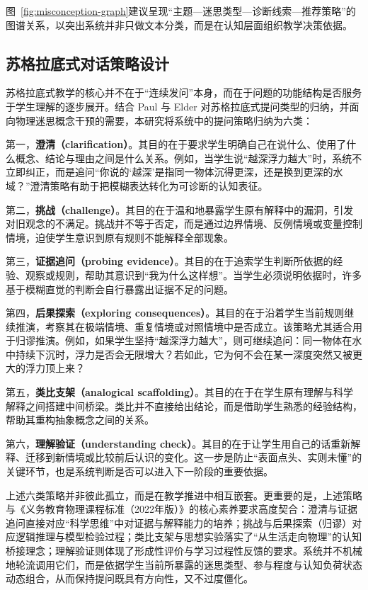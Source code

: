图~\ref{fig:misconception-graph}建议呈现“主题—迷思类型—诊断线索—推荐策略”的图谱关系，以突出系统并非只做文本分类，而是在认知层面组织教学决策依据。

\subsection{苏格拉底式对话策略设计}
\label{sec:4.2.2}

苏格拉底式教学的核心并不在于“连续发问”本身，而在于问题的功能结构是否服务于学生理解的逐步展开。结合 Paul 与 Elder 对苏格拉底式提问类型的归纳\cite{paul2019thinkers}，并面向物理迷思概念干预的需要，本研究将系统中的提问策略归纳为六类：

第一，\textbf{澄清（clarification）}。其目的在于要求学生明确自己在说什么、使用了什么概念、结论与理由之间是什么关系。例如，当学生说“越深浮力越大”时，系统不立即纠正，而是追问“你说的‘越深’是指同一物体沉得更深，还是换到更深的水域？”澄清策略有助于把模糊表达转化为可诊断的认知表征。

第二，\textbf{挑战（challenge）}。其目的在于温和地暴露学生原有解释中的漏洞，引发对旧观念的不满足。挑战并不等于否定，而是通过边界情境、反例情境或变量控制情境，迫使学生意识到原有规则不能解释全部现象。

第三，\textbf{证据追问（probing evidence）}。其目的在于追索学生判断所依据的经验、观察或规则，帮助其意识到“我为什么这样想”。当学生必须说明依据时，许多基于模糊直觉的判断会自行暴露出证据不足的问题。

第四，\textbf{后果探索（exploring consequences）}。其目的在于沿着学生当前规则继续推演，考察其在极端情境、重复情境或对照情境中是否成立。该策略尤其适合用于归谬推演。例如，如果学生坚持“越深浮力越大”，则可继续追问：同一物体在水中持续下沉时，浮力是否会无限增大？若如此，它为何不会在某一深度突然又被更大的浮力顶上来？

第五，\textbf{类比支架（analogical scaffolding）}。其目的在于在学生原有理解与科学解释之间搭建中间桥梁。类比并不直接给出结论，而是借助学生熟悉的经验结构，帮助其重构抽象概念之间的关系。

第六，\textbf{理解验证（understanding check）}。其目的在于让学生用自己的话重新解释、迁移到新情境或比较前后认识的变化。这一步是防止“表面点头、实则未懂”的关键环节，也是系统判断是否可以进入下一阶段的重要依据。

上述六类策略并非彼此孤立，而是在教学推进中相互嵌套。更重要的是，上述策略与《义务教育物理课程标准（2022年版）》的核心素养要求高度契合\cite{moe2022physicsstandard}：澄清与证据追问直接对应“科学思维”中对证据与解释能力的培养；挑战与后果探索（归谬）对应逻辑推理与模型检验过程；类比支架与思想实验落实了“从生活走向物理”的认知桥接理念；理解验证则体现了形成性评价与学习过程性反馈的要求。系统并不机械地轮流调用它们，而是依据学生当前所暴露的迷思类型、参与程度与认知负荷状态动态组合，从而保持提问既具有方向性，又不过度僵化。

